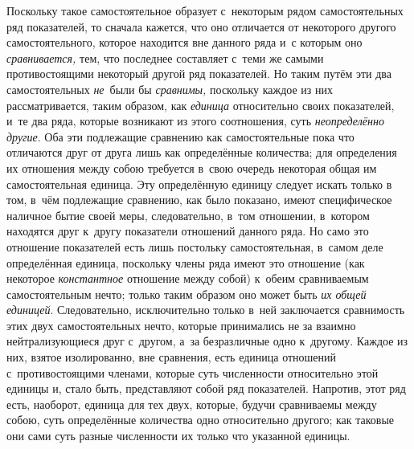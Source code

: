 Поскольку такое самостоятельное образует с~некоторым рядом самостоятельных ряд
показателей, то сначала кажется, что оно отличается от некоторого другого
самостоятельного, которое находится вне данного ряда и~с которым оно
{\em сравнивается,} тем, что последнее составляет с~теми же самыми
противостоящими некоторый другой ряд показателей. Но таким путём эти два
самостоятельных {\em не}~были бы {\em сравнимы,} поскольку каждое из них
рассматривается, таким образом, как {\em единица} относительно своих
показателей, и~те два ряда, которые возникают из этого соотношения, суть
{\em неопределённо другие}. Оба эти подлежащие сравнению как самостоятельные
пока что отличаются друг от друга лишь как определённые количества; для
определения их отношения между собою требуется в~свою очередь некоторая общая
им самостоятельная единица. Эту определённую единицу следует искать только в
том, в~чём подлежащие сравнению, как было показано, имеют специфическое
наличное бытие своей меры, следовательно, в~том отношении, в~котором находятся
друг к~другу показатели отношений данного ряда. Но само это отношение
показателей есть лишь постольку самостоятельная, в~самом деле определённая
единица, поскольку члены ряда имеют это отношение (как некоторое
{\em константное} отношение между собой) к~обеим сравниваемым самостоятельным
нечто; только таким образом оно может быть {\em их общей единицей}.
Следовательно, исключительно только в~ней заключается сравнимость этих двух
самостоятельных нечто, которые принимались не за взаимно нейтрализующиеся друг
с~другом, а~за безразличные одно к~другому. Каждое из них, взятое изолированно,
вне сравнения, есть единица отношений с~противостоящими членами, которые суть
численности относительно этой единицы и, стало быть, представляют собой ряд
показателей. Напротив, этот ряд есть, наоборот, единица для тех двух, которые,
будучи сравниваемы между собою, суть определённые количества одно относительно
другого; как таковые они сами суть разные численности их только что указанной
единицы.

